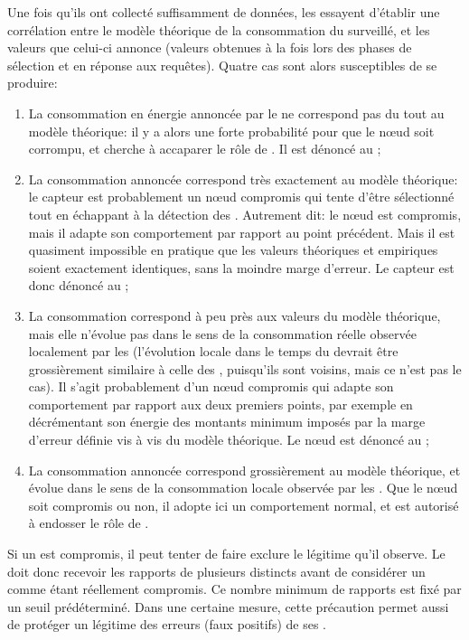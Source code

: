 Une fois qu'ils ont collecté suffisamment de données, les \vns essayent d'établir une corrélation entre le modèle théorique de la consommation du \cn surveillé, et les valeurs que celui-ci annonce (valeurs obtenues à la fois lors des phases de sélection et en réponse aux requêtes).
Quatre cas sont alors susceptibles de se produire:
\begin{enumerate}
    \item La consommation en énergie annoncée par le \cn ne correspond pas du tout au modèle théorique: il y a alors une forte probabilité pour que le nœud soit corrompu, et cherche à accaparer le rôle de \cn. Il est dénoncé au \ch;
    \item La consommation annoncée correspond très exactement au modèle théorique: le capteur est probablement un nœud compromis qui tente d'être sélectionné tout en échappant à la détection des \vns. Autrement dit: le nœud est compromis, mais il adapte son comportement par rapport au point précédent. Mais il est quasiment impossible en pratique que les valeurs théoriques et empiriques soient exactement identiques, sans la moindre marge d'erreur. Le capteur est donc dénoncé au \ch;
    \item La consommation correspond à peu près aux valeurs du modèle théorique, mais elle n'évolue pas dans le sens de la consommation réelle observée localement par les \vns (l'évolution locale dans le temps du \cn devrait être grossièrement similaire à celle des \vns, puisqu'ils sont voisins, mais ce n'est pas le cas). Il s'agit probablement d'un nœud compromis qui adapte son comportement par rapport aux deux premiers points, par exemple en décrémentant son énergie des montants minimum imposés par la marge d'erreur définie vis à vis du modèle théorique. Le nœud est dénoncé au \ch;
    \item La consommation annoncée correspond grossièrement au modèle théorique, et évolue dans le sens de la consommation locale observée par les \vns. Que le nœud soit compromis ou non, il adopte ici un comportement normal, et est autorisé à endosser le rôle de \cn.
\end{enumerate}
Si un \vn est compromis, il peut tenter de faire exclure le \cn légitime qu'il observe.
Le \ch doit donc recevoir les rapports de plusieurs \vns distincts avant de considérer un \cn comme étant réellement compromis.
Ce nombre minimum de rapports est fixé par un seuil prédéterminé.
Dans une certaine mesure, cette précaution permet aussi de protéger un \cn légitime des erreurs (faux positifs) de ses \vns.

